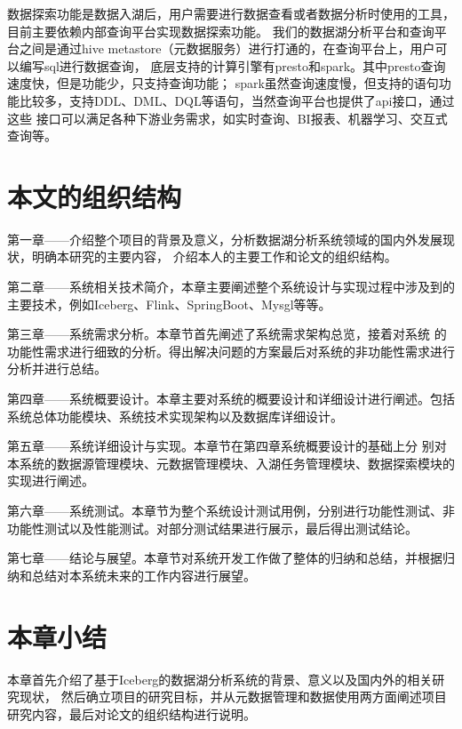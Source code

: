 数据探索功能是数据入湖后，用户需要进行数据查看或者数据分析时使用的工具，目前主要依赖内部查询平台实现数据探索功能。
我们的数据湖分析平台和查询平台之间是通过hive metastore（元数据服务）进行打通的，在查询平台上，用户可以编写sql进行数据查询，
底层支持的计算引擎有presto和spark。其中presto查询速度快，但是功能少，只支持查询功能；
spark虽然查询速度慢，但支持的语句功能比较多，支持DDL、DML、DQL等语句，当然查询平台也提供了api接口，通过这些
接口可以满足各种下游业务需求，如实时查询、BI报表、机器学习、交互式查询等。

\section{本文的组织结构}

第一章——介绍整个项目的背景及意义，分析数据湖分析系统领域的国内外发展现状，明确本研究的主要内容，
介绍本人的主要工作和论文的组织结构。

第二章——系统相关技术简介，本章主要阐述整个系统设计与实现过程中涉及到的主要技术，例如Iceberg、Flink、SpringBoot、Mysgl等等。

第三章——系统需求分析。本章节首先阐述了系统需求架构总览，接着对系统
的功能性需求进行细致的分析。得出解决问题的方案最后对系统的非功能性需求进行分析并进行总结。

第四章——系统概要设计。本章主要对系统的概要设计和详细设计进行阐述。包括系统总体功能模块、系统技术实现架构以及数据库详细设计。

第五章——系统详细设计与实现。本章节在第四章系统概要设计的基础上分
别对本系统的数据源管理模块、元数据管理模块、入湖任务管理模块、数据探索模块的实现进行阐述。

第六章——系统测试。本章节为整个系统设计测试用例，分别进行功能性测试、非功能性测试以及性能测试。对部分测试结果进行展示，最后得出测试结论。

第七章——结论与展望。本章节对系统开发工作做了整体的归纳和总结，并根据归纳和总结对本系统未来的工作内容进行展望。

\section{本章小结}

本章首先介绍了基于Iceberg的数据湖分析系统的背景、意义以及国内外的相关研究现状，
然后确立项目的研究目标，并从元数据管理和数据使用两方面阐述项目研究内容，最后对论文的组织结构进行说明。
